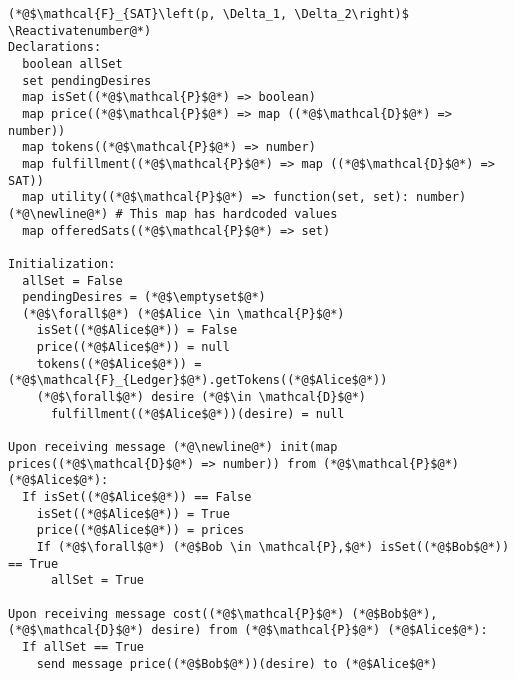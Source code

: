 \Suppressnumber
\begin{lstlisting}[label=satfunc, style=numbers]
(*@$\mathcal{F}_{SAT}\left(p, \Delta_1, \Delta_2\right)$ \Reactivatenumber@*)
Declarations:
  boolean allSet
  set pendingDesires
  map isSet((*@$\mathcal{P}$@*) => boolean)
  map price((*@$\mathcal{P}$@*) => map ((*@$\mathcal{D}$@*) => number))
  map tokens((*@$\mathcal{P}$@*) => number)
  map fulfillment((*@$\mathcal{P}$@*) => map ((*@$\mathcal{D}$@*) => SAT))
  map utility((*@$\mathcal{P}$@*) => function(set, set): number) (*@\newline@*) # This map has hardcoded values
  map offeredSats((*@$\mathcal{P}$@*) => set)

Initialization:
  allSet = False
  pendingDesires = (*@$\emptyset$@*)
  (*@$\forall$@*) (*@$Alice \in \mathcal{P}$@*)
    isSet((*@$Alice$@*)) = False
    price((*@$Alice$@*)) = null
    tokens((*@$Alice$@*)) = (*@$\mathcal{F}_{Ledger}$@*).getTokens((*@$Alice$@*))
    (*@$\forall$@*) desire (*@$\in \mathcal{D}$@*)
      fulfillment((*@$Alice$@*))(desire) = null

Upon receiving message (*@\newline@*) init(map prices((*@$\mathcal{D}$@*) => number)) from (*@$\mathcal{P}$@*) (*@$Alice$@*):
  If isSet((*@$Alice$@*)) == False
    isSet((*@$Alice$@*)) = True
    price((*@$Alice$@*)) = prices
    If (*@$\forall$@*) (*@$Bob \in \mathcal{P},$@*) isSet((*@$Bob$@*)) == True
      allSet = True

Upon receiving message cost((*@$\mathcal{P}$@*) (*@$Bob$@*), (*@$\mathcal{D}$@*) desire) from (*@$\mathcal{P}$@*) (*@$Alice$@*):
  If allSet == True
    send message price((*@$Bob$@*))(desire) to (*@$Alice$@*)


\end{lstlisting}
